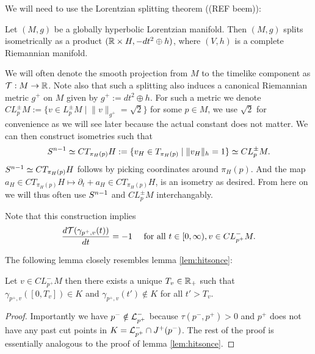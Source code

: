 We will need to use the Lorentzian splitting theorem ((REF beem)):
\begin{theorem} Let $(M,g)$ be a globally hyperbolic Lorentzian manifold. Then $(M,g)$ splits isometrically as a product $(\mathbb{R}\times H,-dt^2\oplus h)$, where $(V,h)$ is a complete Riemannian manifold.
\end{theorem}
We will often denote the smooth projection from $M$ to the timelike component as ${\mathcal{T}}:M\to \mathbb{R}$. Note also that such a splitting also induces a canonical Riemannian metric $g^+$ on $M$ given by $g^+ := dt^2 \oplus h$. For such a metric we denote $CL^\pm_p M:=\{v\in L^\pm_pM\mid \lVert v \rVert_{g^+}=\sqrt{2} \}$ for some $p\in M$, we use $\sqrt{2}$ for convenience as we will see later because the actual constant does not matter. We can then construct isometries such that
\begin{equation}\label{eq:CEQSN}
    {S^{n-1}} \simeq CT_{\pi_H(p)}H := \{v_H\in T_{\pi_H(p)}\mid \lVert v_H \rVert_h =1 \} \simeq CL^\pm_pM.
\end{equation} ${S^{n-1}} \simeq CT_{\pi_H(p)}H$ follows by picking coordinates around $\pi_H(p)$. And the map $a_H\in CT_{\pi_H(p)}H \mapsto \partial_t + a_H \in CT_{\pi_H(p)}H$, is an isometry as desired. From here on we will thus often use ${S^{n-1}}$ and $CL^\pm_pM$ interchangably.

Note that this construction implies 
\begin{equation}\label{eq:constspeed}
    \frac{d{\mathcal{T}}(\gamma_{p^+,v}(t))}{dt} = -1 \quad \text{ for all }t\in [0,\infty), v\in CL^-_{p^+}M.
\end{equation}

The following lemma closely resembles lemma \ref{lem:hitsonce}:
\begin{lemma}\label{lem:Tvdef}
    Let $v\in CL^-_{p^+}M$ then there exists a unique $T_v\in \mathbb{R}_+$ such that $\gamma_{p^+,v}([0,T_v])\in K$ and $\gamma_{p^+,v}(t')\notin K$ for all $t'>T_v$.
\end{lemma}
\begin{proof}
    Importantly we have $p^-\notin {\mathcal{L}}^-_{p^+}$ because $\tau(p^-,p^+)>0$ and $p^+$ does not have any past cut points in $K={\mathcal{L}}^-_{p^+}\cap J^+(p^-)$. The rest of the proof is essentially analogous to the proof of lemma \ref{lem:hitsonce}.
\end{proof}

